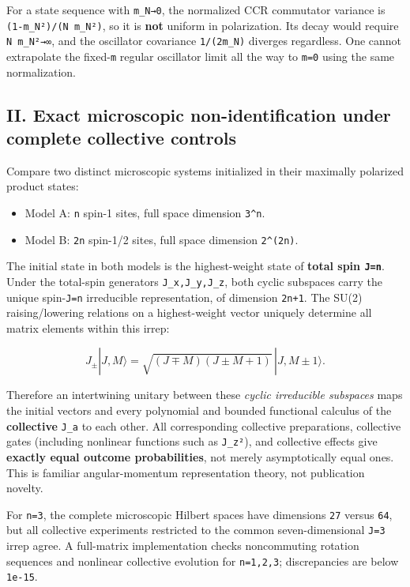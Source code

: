 \documentclass[
  10pt,
  a4paper,
]{article}
\providecommand{\tightlist}{%
  \setlength{\itemsep}{0pt}\setlength{\parskip}{0pt}}
\begin{document}
For a state sequence with \texttt{m\_N→0}, the normalized CCR commutator variance is \texttt{(1-m\_N²)/(N\ m\_N²)}, so it is \textbf{not} uniform in polarization. Its decay would require \texttt{N\ m\_N²→∞}, and the oscillator covariance \texttt{1/(2m\_N)} diverges regardless. One cannot extrapolate the fixed-\texttt{m} regular oscillator limit all the way to \texttt{m=0} using the same normalization.

\subsection{II. Exact microscopic non-identification under complete collective controls}\label{ii.-exact-microscopic-non-identification-under-complete-collective-controls}

Compare two distinct microscopic systems initialized in their maximally polarized product states:

\begin{itemize}
\tightlist
\item
  Model A: \texttt{n} spin-1 sites, full space dimension \texttt{3\^{}n}.
\item
  Model B: \texttt{2n} spin-1/2 sites, full space dimension \texttt{2\^{}(2n)}.
\end{itemize}

The initial state in both models is the highest-weight state of \textbf{total spin \texttt{J=n}}. Under the total-spin generators \texttt{J\_x,J\_y,J\_z}, both cyclic subspaces carry the unique spin-\texttt{J=n} irreducible representation, of dimension \texttt{2n+1}. The SU(2) raising/lowering relations on a highest-weight vector uniquely determine all matrix elements within this irrep:

\[
J_\pm|J,M\rangle=\sqrt{(J\mp M)(J\pm M+1)}\,|J,M\pm1\rangle.
\]

Therefore an intertwining unitary between these \emph{cyclic irreducible subspaces} maps the initial vectors and every polynomial and bounded functional calculus of the \textbf{collective} \texttt{J\_a} to each other. All corresponding collective preparations, collective gates (including nonlinear functions such as \texttt{J\_z²}), and collective effects give \textbf{exactly equal outcome probabilities}, not merely asymptotically equal ones. This is familiar angular-momentum representation theory, not publication novelty.

For \texttt{n=3}, the complete microscopic Hilbert spaces have dimensions \texttt{27} versus \texttt{64}, but all collective experiments restricted to the common seven-dimensional \texttt{J=3} irrep agree. A full-matrix implementation checks noncommuting rotation sequences and nonlinear collective evolution for \texttt{n=1,2,3}; discrepancies are below \texttt{1e-15}.
\end{document}
